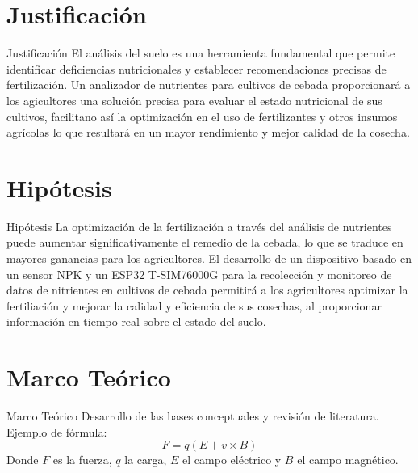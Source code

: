 \documentclass{beamer}
\begin{document}
\section{Justificación}
\begin{frame}{Justificación}
   El análisis del suelo es una herramienta fundamental que permite identificar deficiencias nutricionales y establecer recomendaciones precisas de fertilización. Un analizador de nutrientes para cultivos de cebada proporcionará a los agicultores una solución precisa para evaluar el estado nutricional de sus cultivos, facilitano así la optimización en el uso de fertilizantes y otros insumos agrícolas lo que resultará en un mayor rendimiento y mejor calidad de la cosecha.
\end{frame}


\section{Hipótesis}
\begin{frame}{Hipótesis}
La optimización de la fertilización a través del análisis de nutrientes puede aumentar significativamente el remedio de la cebada, lo que se traduce en mayores ganancias para los agricultores.
El desarrollo de un dispositivo basado en un sensor NPK y un ESP32 T-SIM76000G para la recolección y monitoreo de datos de nitrientes en cultivos de cebada permitirá a los agricultores aptimizar la fertiliación y mejorar la calidad y eficiencia de sus cosechas, al proporcionar información en tiempo real sobre el estado del suelo.


\end{frame}

\section{Marco Teórico}
\begin{frame}{Marco Teórico}
    Desarrollo de las bases conceptuales y revisión de literatura. Ejemplo de fórmula:
    \begin{equation}
        F = q(E + v \times B)
    \end{equation}
    Donde $F$ es la fuerza, $q$ la carga, $E$ el campo eléctrico y $B$ el campo magnético.
\end{frame}

\end{document}
